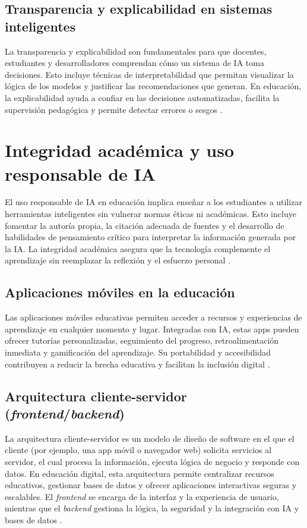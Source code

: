 \subsection{Transparencia y explicabilidad en sistemas inteligentes}
La transparencia y explicabilidad son fundamentales para que docentes,
estudiantes y desarrolladores comprendan cómo un sistema de IA toma decisiones.
Esto incluye técnicas de interpretabilidad que permitan visualizar la lógica de
los modelos y justificar las recomendaciones que generan. En educación, la
explicabilidad ayuda a confiar en las decisiones automatizadas, facilita la
supervisión pedagógica y permite detectar errores o sesgos
\cite{doshi2017towards, lipton2018mythos}.

\section{Integridad académica y uso responsable de IA}
El uso responsable de IA en educación implica enseñar a los estudiantes a
utilizar herramientas inteligentes sin vulnerar normas éticas ni académicas.
Esto incluye fomentar la autoría propia, la citación adecuada de fuentes y el
desarrollo de habilidades de pensamiento crítico para interpretar la
información generada por la IA. La integridad académica asegura que la
tecnología complemente el aprendizaje sin reemplazar la reflexión y el esfuerzo
personal \cite{bretag2019academic, eaton2023postplagiarism}.

\subsection{Aplicaciones móviles en la educación}
Las aplicaciones móviles educativas permiten acceder a recursos y experiencias
de aprendizaje en cualquier momento y lugar. Integradas con IA, estas apps
pueden ofrecer tutorías personalizadas, seguimiento del progreso,
retroalimentación inmediata y gamificación del aprendizaje. Su portabilidad y
accesibilidad contribuyen a reducir la brecha educativa y facilitan la
inclusión digital \cite{traxler2009learning, crompton2018use}.

\subsection{Arquitectura cliente-servidor (\textit{frontend}/\textit{backend})}
La arquitectura cliente-servidor es un modelo de diseño de software en el que
el cliente (por ejemplo, una app móvil o navegador web) solicita servicios al
servidor, el cual procesa la información, ejecuta lógica de negocio y responde
con datos. En educación digital, esta arquitectura permite centralizar recursos
educativos, gestionar bases de datos y ofrecer aplicaciones interactivas
seguras y escalables. El \textit{frontend} se encarga de la interfaz y la experiencia de
usuario, mientras que el \textit{backend} gestiona la lógica, la seguridad y la
integración con IA y bases de datos \cite{tanenbaum2007distributed,
    hwang2011cloud}.

